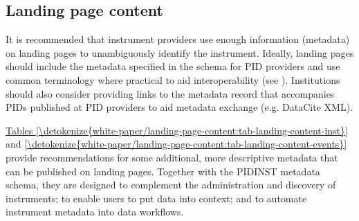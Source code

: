 \documentclass[a4paper,10pt,english]{sphinxmanual}
\begin{document}
\subsection{Landing page content}
\label{\detokenize{white-paper/landing-page-content:landing-page-content}}\label{\detokenize{white-paper/landing-page-content:id1}}\label{\detokenize{white-paper/landing-page-content::doc}}
It is recommended that instrument providers use enough information
(metadata) on landing pages to unambiguously identify the instrument.
Ideally, landing pages should include the metadata specified in the
schema for PID providers and use common terminology where practical to
aid interoperability (see {\hyperref[\detokenize{white-paper/metadata-schema-recommendations:pidinst-metadata-schema-terminologies}]{}}).
Institutions should also consider providing links to the metadata record
that accompanies PIDs published at PID providers to aid metadata
exchange (e.g. DataCite XML).

\hyperref[\detokenize{white-paper/landing-page-content:tab-landing-content-inst}]{Tables \ref{\detokenize{white-paper/landing-page-content:tab-landing-content-inst}}} and
\hyperref[\detokenize{white-paper/landing-page-content:tab-landing-content-events}]{\ref{\detokenize{white-paper/landing-page-content:tab-landing-content-events}}} provide recommendations for
some additional, more descriptive metadata that can be published on
landing pages. Together with the PIDINST metadata schema, they are
designed to complement the administration and discovery of
instruments; to enable users to put data into context; and to automate
instrument metadata into data workflows.
\end{document}
